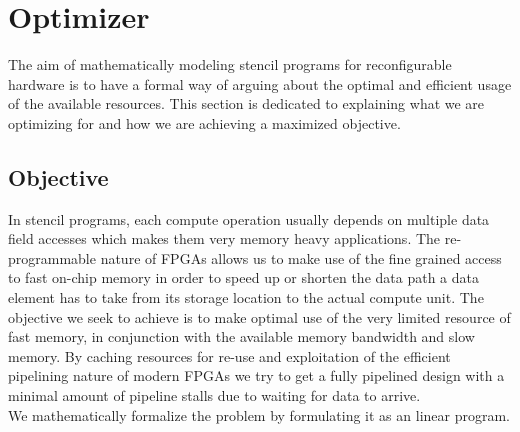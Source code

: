 \chapter{Optimizer}
The aim of mathematically modeling stencil programs for reconfigurable hardware is to have a formal way of arguing about the optimal and efficient usage of the available resources. This section is dedicated to explaining what we are optimizing for and how we are achieving a maximized objective.


\section{Objective}
In stencil programs, each compute operation usually depends on multiple data field accesses which makes them very memory heavy applications. The re-programmable nature of FPGAs allows us to make use of the fine grained access to fast on-chip memory in order to speed up or shorten the data path a data element has to take from its storage location to the actual compute unit. The objective we seek to achieve is to make optimal use of the very limited resource of fast memory, in conjunction with the available memory bandwidth and slow memory. By caching resources for re-use and exploitation of the efficient pipelining nature of modern FPGAs we try to get a fully pipelined design with a minimal amount of pipeline stalls due to waiting for data to arrive. \\
We mathematically formalize the problem by formulating it as an linear program.

